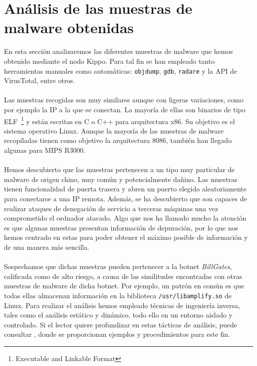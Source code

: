 \documentclass[journal]{IEEEtran}
\begin{document}
\section{Análisis de las muestras de malware obtenidas}

En esta sección analizaremos las diferentes muestras de malware que hemos obtenido mediante el nodo Kippo. Para tal fin se han empleado tanto herramientas manuales como automáticas: {\tt objdump}, {\tt gdb}, {\tt radare} y la API de VirusTotal, entre otros.
\\\\
Las muestras recogidas son muy similares aunque con ligeras variaciones, como por ejemplo la IP a la que se conectan. La mayoría de ellas son binarios de tipo ELF~\footnote{Executable and Linkable Format} y están escritas en C o C++ para arquitectura x86. Su objetivo es el sistema operativo Linux. Aunque la mayoría de las muestras de malware recopiladas tienen como objetivo la arquitectura 8086, también han llegado algunas para MIPS R3000.
\\\\
Hemos descubierto que las muestras pertenecen a un tipo muy particular de malware de origen chino, muy común y potencialmente dañino. Las muestras tienen funcionalidad de puerta trasera y abren un puerto elegido aleatoriamente para conectarse a una IP remota. Además, se ha descubierto que son capaces de realizar ataques de denegación de servicio a terceras máquinas una vez comprometido el ordnador atacado. Algo que nos ha llamado mucho la atención es que algunas muestras presentan información de depuración, por lo que nos hemos centrado en estas para poder obtener el máximo posible de información y de una manera más sencilla.
\\\\
Sospechamos que dichas muestras pueden pertenecer a la botnet \textit{BillGates}, calificada como de alto riesgo, a causa de las similitudes encontradas con otras muestras de malware de dicha botnet. Por ejemplo, un patrón en común es que todas ellas almacenan información en la biblioteca {\tt /usr/libamplify.so} de Linux. Para realizar el análisis hemos empleado técnicas de ingeniería inversa, tales como el análisis estático y dinámico, todo ello en un entorno aislado y controlado. Si el lector quiere profundizar en estas tácticas de análisis, puede consultar \cite{honeywell2004know}, donde se proporcionan ejemplos y procedimientos para este fin.
\end{document}
